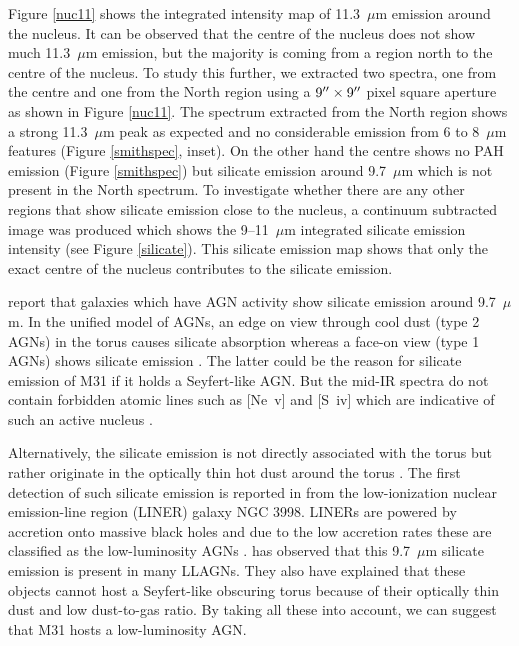 Figure \ref{nuc11} shows the integrated intensity map of 11.3~$\mu$m emission around the nucleus. It can be observed that the centre of the nucleus
does not show much 11.3~$\mu$m emission, but the majority is coming from a region north to the centre of the nucleus. To study this further, we extracted two 
spectra, one from the centre and one from the North region using a $9\hbox{$^{\prime\prime}$} \times 9\hbox{$^{\prime\prime}$}$ pixel square aperture as shown in Figure \ref{nuc11}. The spectrum extracted 
from the North region shows a strong 11.3~$\mu$m peak as expected and no considerable emission from 6 to 8~$\mu$m features (Figure \ref{smithspec}, inset). 
On the other hand the centre shows no PAH emission (Figure \ref{smithspec}) but silicate emission around 9.7~$\mu$m which is not present in the North spectrum. 
To investigate whether there are any other regions that show silicate emission close to the nucleus, a continuum subtracted image was produced which shows the 
9--11~$\mu$m integrated silicate emission intensity (see Figure \ref{silicate}). This silicate emission map shows that only the exact centre of the nucleus contributes 
to the silicate emission. 

\citet{Spoon2007} report that galaxies which have AGN activity show silicate emission around 9.7~$\mu$m.
In the unified model of AGNs, an edge on view through cool dust (type 2 AGNs) in the torus causes silicate absorption whereas a face-on view (type 1 AGNs) 
shows silicate emission \citep{AGNtypes1995}. The latter could be the reason for silicate emission of M31 if it holds a Seyfert-like AGN. 
But the mid-IR spectra do not contain forbidden atomic lines such as [Ne~{\sc v}] and [S~{\sc iv}] which are indicative of such an active nucleus \citep{AGNref}.

 Alternatively, the silicate emission is not directly associated with the torus but rather originate in the optically thin hot dust around the torus \citep{Mason2012}. 
 The first detection of such silicate emission is reported in \citet{Sturm2005} from the low-ionization nuclear emission-line region (LINER) galaxy NGC 3998. 
 LINERs are powered by accretion onto massive black holes and due to the low accretion rates these are classified as the low-luminosity AGNs \citep{Kewley2006}. 
 \citealt{Mason2012} has observed that this 9.7~$\mu$m silicate emission is present in many LLAGNs. They also have explained that these objects cannot 
 host a Seyfert-like obscuring torus because of their optically thin dust and low dust-to-gas ratio. By taking all these into account, we can suggest that M31 
 hosts a low-luminosity AGN. 


